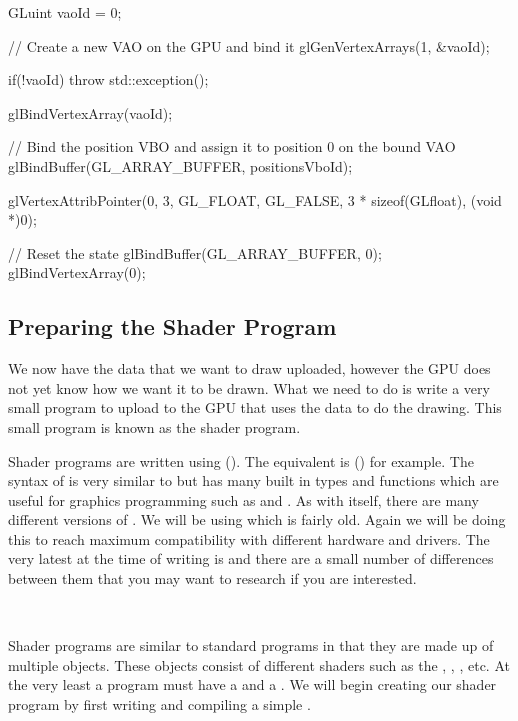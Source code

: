 \documentclass[10pt]{article}
\begin{document}
\begin{Code}
  GLuint vaoId = 0;

  // Create a new VAO on the GPU and bind it
  glGenVertexArrays(1, &vaoId);

  if(!vaoId)
  {
    throw std::exception();
  }

  glBindVertexArray(vaoId);

  // Bind the position VBO and assign it to position 0 on the bound VAO
  glBindBuffer(GL_ARRAY_BUFFER, positionsVboId);

  glVertexAttribPointer(0, 3, GL_FLOAT, GL_FALSE,
    3 * sizeof(GLfloat), (void *)0);

  // Reset the state
  glBindBuffer(GL_ARRAY_BUFFER, 0);
  glBindVertexArray(0);
\end{Code}


\subsection*{Preparing the Shader Program}
We now have the data that we want to draw uploaded, however the GPU does
not yet know how we want it to be drawn. What we need to do is write
a very small program to upload to the GPU that uses the data to do the
drawing. This small program is known as the shader program.

Shader programs are written using 
(). The  equivalent is  () for example.  The syntax of 
is very similar to  but has many built in types and functions
which are useful for graphics programming such as  and
. As with  itself, there are many different
versions of . We will be using  which is fairly
old. Again we will be doing this to reach maximum compatibility with
different hardware and drivers. The very latest at the time of writing
is  and there are a small number of differences
between them that you may want to research if you are interested.

\

Shader programs are similar to standard  programs in that
they are made up of multiple objects. These objects consist of different
shaders such as the , ,
, etc. At the very least a program must have a
 and a . We will begin creating
our shader program by first writing and compiling a simple .
\end{document}
